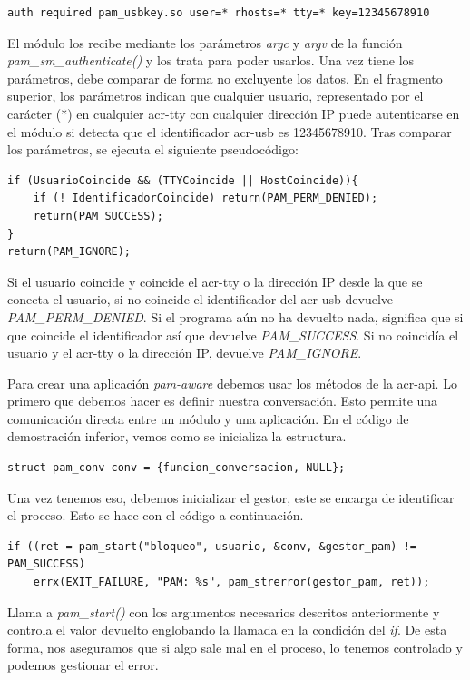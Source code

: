 \documentclass[twoside, titlepage, 12pt, a4paper]{article}
\begin{document}
{\begin{lstlisting}
auth required pam_usbkey.so user=* rhosts=* tty=* key=12345678910
\end{lstlisting}
El módulo los recibe mediante los parámetros \textit{argc} y \textit{argv} de la función \textit{pam\_sm\_authenticate()} y los trata para poder usarlos. Una vez tiene los parámetros, debe comparar de forma no excluyente los datos. En el fragmento superior, los parámetros indican que cualquier usuario, representado por el carácter (*) en cualquier \gls{acr-tty} con cualquier dirección IP puede autenticarse en el módulo si detecta que el identificador \gls{acr-usb} es 12345678910. Tras comparar los parámetros, se ejecuta el siguiente pseudocódigo:
\begin{lstlisting}[xleftmargin=.07\textwidth]
if (UsuarioCoincide && (TTYCoincide || HostCoincide)){
	if (! IdentificadorCoincide) return(PAM_PERM_DENIED);
	return(PAM_SUCCESS);
}
return(PAM_IGNORE);
\end{lstlisting}
Si el usuario coincide y coincide el \gls{acr-tty} o la dirección IP desde la que se conecta el usuario, si no coincide el identificador del \gls{acr-usb} devuelve \textit{PAM\_PERM\_DENIED}. Si el programa aún no ha devuelto nada, significa que si que coincide el identificador así que devuelve \textit{PAM\_SUCCESS}. Si no coincidía el usuario y el \gls{acr-tty} o la dirección IP, devuelve \textit{PAM\_IGNORE}.\par
Para crear una aplicación \textit{pam-aware} debemos usar los métodos de la \gls{acr-api}. Lo primero que debemos hacer es definir nuestra conversación. Esto permite una comunicación directa entre un módulo y una aplicación. En el código de demostración inferior, vemos como se inicializa la estructura.
\begin{lstlisting}[xleftmargin=.1\textwidth]
struct pam_conv conv = {funcion_conversacion, NULL};
\end{lstlisting}
Una vez tenemos eso, debemos inicializar el gestor, este se encarga de identificar el proceso. Esto se hace con el código a continuación.
\begin{lstlisting}[xleftmargin=0\textwidth]
if ((ret = pam_start("bloqueo", usuario, &conv, &gestor_pam) != PAM_SUCCESS)
	errx(EXIT_FAILURE, "PAM: %s", pam_strerror(gestor_pam, ret));
\end{lstlisting}
Llama a \textit{pam\_start()} con los argumentos necesarios descritos anteriormente y controla el valor devuelto englobando la llamada en la condición del \textit{if}. De esta forma, nos aseguramos que si algo sale mal en el proceso, lo tenemos controlado y podemos gestionar el error.\par
}
\end{document}
